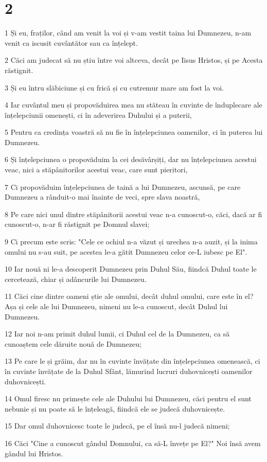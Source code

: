 \chapter{2}

\par 1 Și eu, fraților, când am venit la voi și v-am vestit taina lui Dumnezeu, n-am venit ca iscusit cuvântător sau ca înțelept.
\par 2 Căci am judecat să nu știu între voi altceva, decât pe Iisus Hristos, și pe Acesta răstignit.
\par 3 Și eu întru slăbiciune și cu frică și cu cutremur mare am fost la voi.
\par 4 Iar cuvântul meu și propovăduirea mea nu stăteau în cuvinte de înduplecare ale înțelepciunii omenești, ci în adeverirea Duhului și a puterii,
\par 5 Pentru ca credința voastră să nu fie în înțelepciunea oamenilor, ci în puterea lui Dumnezeu.
\par 6 Și înțelepciunea o propovăduim la cei desăvârșiți, dar nu înțelepciunea acestui veac, nici a stăpânitorilor acestui veac, care sunt pieritori,
\par 7 Ci propovăduim înțelepciunea de taină a lui Dumnezeu, ascunsă, pe care Dumnezeu a rânduit-o mai înainte de veci, spre slava noastră,
\par 8 Pe care nici unul dintre stăpânitorii acestui veac n-a cunoscut-o, căci, dacă ar fi cunoscut-o, n-ar fi răstignit pe Domnul slavei;
\par 9 Ci precum este scris: "Cele ce ochiul n-a văzut și urechea n-a auzit, și la inima omului nu s-au suit, pe acestea le-a gătit Dumnezeu celor ce-L iubesc pe El".
\par 10 Iar nouă ni le-a descoperit Dumnezeu prin Duhul Său, fiindcă Duhul toate le cercetează, chiar și adâncurile lui Dumnezeu.
\par 11 Căci cine dintre oameni știe ale omului, decât duhul omului, care este în el? Așa și cele ale lui Dumnezeu, nimeni nu le-a cunoscut, decât Duhul lui Dumnezeu.
\par 12 Iar noi n-am primit duhul lumii, ci Duhul cel de la Dumnezeu, ca să cunoaștem cele dăruite nouă de Dumnezeu;
\par 13 Pe care le și grăim, dar nu în cuvinte învățate din înțelepciunea omenească, ci în cuvinte învățate de la Duhul Sfânt, lămurind lucruri duhovnicești oamenilor duhovnicești.
\par 14 Omul firesc nu primește cele ale Duhului lui Dumnezeu, căci pentru el sunt nebunie și nu poate să le înțeleagă, fiindcă ele se judecă duhovnicește.
\par 15 Dar omul duhovnicesc toate le judecă, pe el însă nu-l judecă nimeni;
\par 16 Căci "Cine a cunoscut gândul Domnului, ca să-L învețe pe El?" Noi însă avem gândul lui Hristos.

